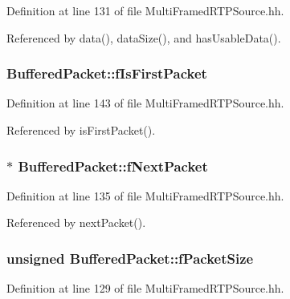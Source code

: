 Definition at line 131 of file Multi\+Framed\+R\+T\+P\+Source.\+hh.



Referenced by data(), data\+Size(), and has\+Usable\+Data().

\subsubsection[{f\+Is\+First\+Packet}]{ Buffered\+Packet\+::f\+Is\+First\+Packet\hspace{0.3cm}{\ttfamily [private]}}\label{classBufferedPacket_a7db19c86593d8675669f4b4b5d48e943}


Definition at line 143 of file Multi\+Framed\+R\+T\+P\+Source.\+hh.



Referenced by is\+First\+Packet().

\subsubsection[{f\+Next\+Packet}]{$\ast$ Buffered\+Packet\+::f\+Next\+Packet\hspace{0.3cm}{\ttfamily [private]}}\label{classBufferedPacket_a8de5fc5a6feca861cf036e69fd272d35}


Definition at line 135 of file Multi\+Framed\+R\+T\+P\+Source.\+hh.



Referenced by next\+Packet().

\subsubsection[{f\+Packet\+Size}]{\setlength{\rightskip}{0pt plus 5cm}unsigned Buffered\+Packet\+::f\+Packet\+Size\hspace{0.3cm}{\ttfamily [protected]}}\label{classBufferedPacket_adeaeaf805ffe83fb1618fe011cf17d93}


Definition at line 129 of file Multi\+Framed\+R\+T\+P\+Source.\+hh.



